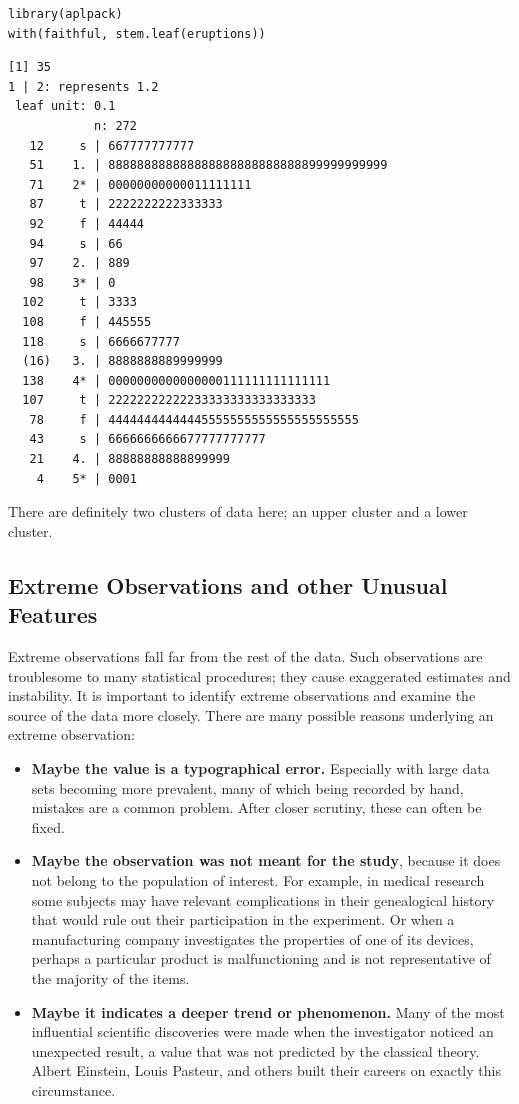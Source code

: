 \documentclass[captions=tableheading]{scrbook}
\begin{document}
\begin{verbatim}
library(aplpack)
with(faithful, stem.leaf(eruptions))
\end{verbatim}


\begin{verbatim}
[1] 35
1 | 2: represents 1.2
 leaf unit: 0.1
            n: 272
   12     s | 667777777777
   51    1. | 888888888888888888888888888899999999999
   71    2* | 00000000000011111111
   87     t | 2222222222333333
   92     f | 44444
   94     s | 66
   97    2. | 889
   98    3* | 0
  102     t | 3333
  108     f | 445555
  118     s | 6666677777
  (16)   3. | 8888888889999999
  138    4* | 0000000000000000111111111111111
  107     t | 22222222222233333333333333333
   78     f | 44444444444445555555555555555555555
   43     s | 6666666666677777777777
   21    4. | 88888888888899999
    4    5* | 0001
\end{verbatim}

There are definitely two clusters of data here; an upper cluster and a lower cluster. 
\subsection{Extreme Observations and other Unusual Features}
\label{sec-3-2-5}

\label{sub:Extreme-Observations-and}

Extreme observations fall far from the rest of the data. Such observations are troublesome to many statistical procedures; they cause exaggerated estimates and instability. It is important to identify extreme observations and examine the source of the data more closely. There are many possible reasons underlying an extreme observation:

\begin{itemize}
\item \textbf{Maybe the value is a typographical error.} Especially with large data sets becoming more prevalent, many of which being recorded by hand, mistakes are a common problem. After closer scrutiny, these can often be fixed.
\item \textbf{Maybe the observation was not meant for the study}, because it does not belong to the population of interest. For example, in medical research some subjects may have relevant complications in their genealogical history that would rule out their participation in the experiment. Or when a manufacturing company investigates the properties of one of its devices, perhaps a particular product is malfunctioning and is not representative of the majority of the items.
\item \textbf{Maybe it indicates a deeper trend or phenomenon.} Many of the most influential scientific discoveries were made when the investigator noticed an unexpected result, a value that was not predicted by the classical theory. Albert Einstein, Louis Pasteur, and others built their careers on exactly this circumstance.
\end{itemize}
\end{document}
